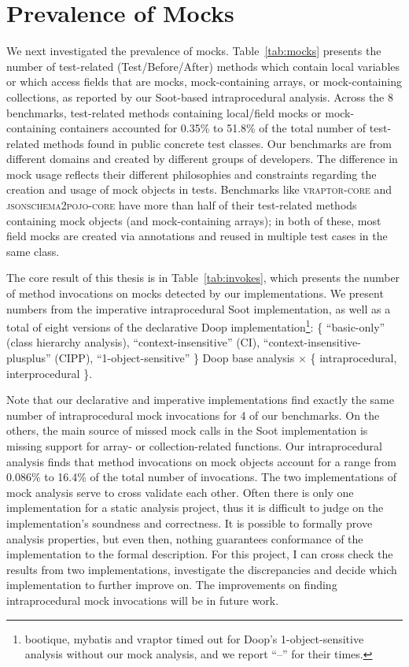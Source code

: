 \section{Prevalence of Mocks}

We next investigated the prevalence of mocks. Table~\ref{tab:mocks} presents the number of test-related (Test/Before/After) methods which contain local variables or which access fields that are mocks, mock-containing arrays, or mock-containing collections, as reported by our Soot-based intraprocedural analysis. Across the 8 benchmarks, test-related methods containing local/field mocks or mock-containing containers accounted for 0.35\% to 51.8\% of the total number of test-related methods found in public concrete test classes. Our benchmarks are from different domains and created by different groups of developers. The difference in mock usage reflects their different philosophies and constraints regarding the creation and usage of mock objects in tests. Benchmarks like \textsc{vraptor-core} and \textsc{jsonschema2pojo-core} have more than half of their test-related methods containing mock objects (and mock-containing arrays); in both of these, most field mocks are created via annotations and reused in multiple test cases in the same class.

The core result of this thesis is in Table~\ref{tab:invokes}, which presents the number of method invocations on mocks detected by our implementations. We present numbers from the imperative intraprocedural Soot implementation, as well as a total of eight versions of the declarative Doop implementation\footnote{bootique, mybatis and vraptor timed out for Doop's 1-object-sensitive analysis without our mock analysis, and we report ``--'' for their times.}: \{ ``basic-only'' (class hierarchy analysis), ``context-insensitive'' (CI), ``context-insensitive-plusplus'' (CIPP), ``1-object-sensitive'' \} Doop base analysis $\times$ \{ intraprocedural, interprocedural \}. 

Note that our declarative and imperative implementations find exactly the same number of intraprocedural mock invocations for 4 of our benchmarks. On the others, the main source of missed mock calls in the Soot implementation is missing support for array- or collection-related functions. Our intraprocedural analysis finds that method invocations on mock objects account for a range from 0.086\% to 16.4\% of the total number of invocations. The two implementations of mock analysis serve to cross validate each other. Often there is only one implementation for a static analysis project, thus it is difficult to judge on the implementation's soundness and correctness. It is possible to formally prove analysis properties, but even then, nothing guarantees conformance of the implementation to the formal description. For this project, I can cross check the results from two implementations, investigate the discrepancies and decide which implementation to further improve on. The improvements on finding intraprocedural mock invocations will be in future work.

